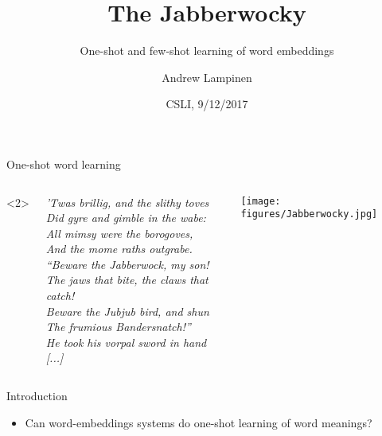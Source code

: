 \documentclass{beamer}
\begin{document}
\title{The Jabberwocky}
\subtitle{One-shot and few-shot learning of word embeddings}
\author{Andrew Lampinen}
\date{CSLI, 9/12/2017}
\frame{\titlepage}

\begin{frame}{One-shot word learning}
\begin{columns}<2>
\begin{column}{0.5\textwidth}
\textit{’Twas brillig, and the slithy toves}\\
\textit{Did gyre and gimble in the wabe:}\\ 
\textit{All mimsy were the borogoves,}\\
\textit{And the mome raths outgrabe.}\\[10pt]

\textit{“Beware the Jabberwock, my son! }\\
\textit{The jaws that bite, the claws that catch!}\\
\textit{Beware the Jubjub bird, and shun}\\ 
\textit{The frumious Bandersnatch!” }\\[10pt]

\textit{He took his vorpal sword in hand}\\
\textit{[...]}
\end{column}
\begin{column}{0.5\textwidth}
\centering
\texttt{[image: figures/Jabberwocky.jpg]}
\end{column}
\end{columns}
\end{frame}

\begin{frame}{Introduction}
\begin{itemize}
    \item<1-> Can word-embeddings systems do one-shot learning of word meanings? 
\end{itemize}
\end{frame}
\end{document}
